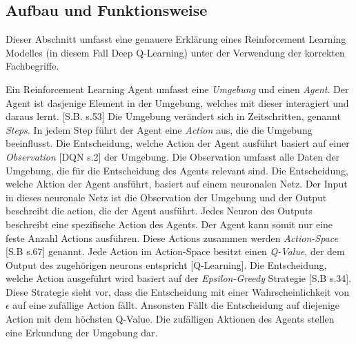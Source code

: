 \subsection{Aufbau und Funktionsweise}
Dieser Abschnitt umfasst eine genauere Erklärung eines Reinforcement Learning
Modelles (in diesem Fall Deep Q-Learning) unter der Verwendung der korrekten
Fachbegriffe.

Ein Reinforcement Learning Agent umfasst eine \emph{Umgebung} und einen
\emph{Agent}. Der Agent ist dasjenige Element in der Umgebung, welches mit
dieser interagiert und daraus lernt. [S.B. s.53] Die Umgebung verändert sich in
Zeitschritten, genannt \emph{Steps}. In jedem Step führt der Agent eine
\emph{Action} aus, die die Umgebung beeinflusst. Die Entscheidung, welche Action
der Agent ausführt basiert auf einer \emph{Observation} [DQN s.2] der Umgebung. Die
Observation umfasst alle Daten der Umgebung, die für die Entscheidung des Agents
relevant sind. Die Entscheidung, welche Aktion der Agent ausführt, basiert auf
einem neuronalen Netz. Der Input in dieses neuronale Netz ist die Observation
der Umgebung und der Output beschreibt die action, die der Agent ausführt. Jedes
Neuron des Outputs beschreibt eine spezifische Action des Agents. Der Agent kann
somit nur eine feste Anzahl Actions ausführen. Diese Actions zusammen werden
\emph{Action-Space} [S.B s.67] genannt. Jede Action im Action-Space besitzt einen
\emph{Q-Value}, der dem Output des zugehörigen neurons entspricht [Q-Learning]. Die
Entscheidung, welche Action ausgeführt wird basiert auf der
\emph{Epsilon-Greedy} Strategie [S.B s.34]. Diese Strategie sieht vor, dass die
Entscheidung mit einer Wahrscheinlichkeit von $\epsilon$ auf eine zufällige
Action fällt. Ansonsten Fällt die Entscheidung auf diejenige Action mit dem
höchsten Q-Value. Die zufälligen Aktionen des Agents stellen eine Erkundung der
Umgebung dar.

